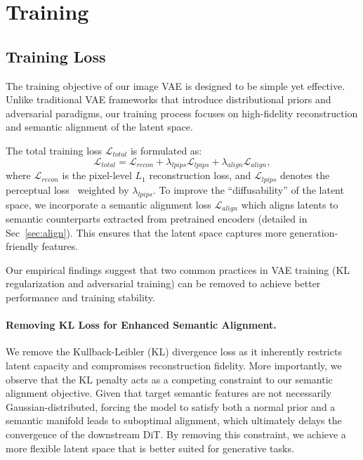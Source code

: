 \section{Training}

\subsection{Training Loss}
The training objective of our image VAE is designed to be simple yet effective. Unlike traditional VAE frameworks that introduce distributional priors and adversarial paradigms, our training process focuses on high-fidelity reconstruction and semantic alignment of the latent space.

The total training loss $\mathcal{L}_{total}$ is formulated as:
\begin{equation}
\mathcal{L}_{total} = \mathcal{L}_{recon} + \lambda_{lpips} \mathcal{L}_{lpips} + \lambda_{align} \mathcal{L}_{align},
\end{equation}
where $\mathcal{L}_{recon}$ is the pixel-level $L_1$ reconstruction loss, and $\mathcal{L}_{lpips}$ denotes the perceptual loss~\citep{lpips} weighted by $\lambda_{lpips}$. To improve the ``diffusability'' of the latent space, we incorporate a semantic alignment loss $\mathcal{L}_{align}$ which aligns latents to semantic counterparts extracted from pretrained encoders (detailed in Sec~\ref{sec:align}). This ensures that the latent space captures more generation-friendly features.

Our empirical findings suggest that two common practices in VAE training (KL regularization and adversarial training) can be removed to achieve better performance and training stability.

\paragraph{Removing KL Loss for Enhanced Semantic Alignment.} 
We remove the Kullback-Leibler (KL) divergence loss as it inherently restricts latent capacity and compromises reconstruction fidelity. More importantly, we observe that the KL penalty acts as a competing constraint to our semantic alignment objective. Given that target semantic features are not necessarily Gaussian-distributed, forcing the model to satisfy both a normal prior and a semantic manifold leads to suboptimal alignment, which ultimately delays the convergence of the downstream DiT. By removing this constraint, we achieve a more flexible latent space that is better suited for generative tasks.

